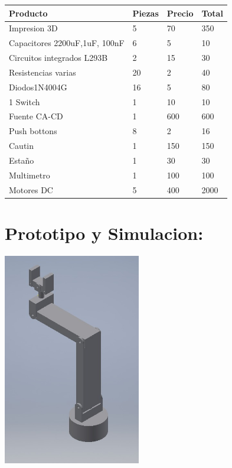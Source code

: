 \documentclass[14pt,a4paper]{article}
\begin{document}
\begin{tabular}{|l|l|l|l|}
\hline
	Producto & Piezas & Precio & Total\\
\hline
	Impresion 3D & 5 & 70 & 350\\

\hline
	Capacitores 2200uF,1uF, 100nF & 6 & 5 & 10\\
\hline
	 Circuitos integrados L293B & 2 & 15 & 30\\
\hline
	Resistencias varias & 20 & 2 & 40\\
\hline
	Diodos1N4004G & 16 & 5 & 80\\
\hline
	1 Switch & 1 & 10 & 10\\

\hline
	Fuente CA-CD & 1 & 600 & 600\\
\hline
	Push bottons & 8 & 2 & 16\\
\hline
Cautin & 1 & 150 & 150\\
\hline
	Estaño & 1 & 30 & 30\\
\hline
	Multimetro & 1 & 100 & 100\\
\hline
Motores DC & 5 & 400 & 2000\\
\hline
\end{tabular}

\section{Prototipo y Simulacion:}
\begin{center}
\includegraphics[width=6cm]{Proto.jpeg}
\end{center}
\end{document}
